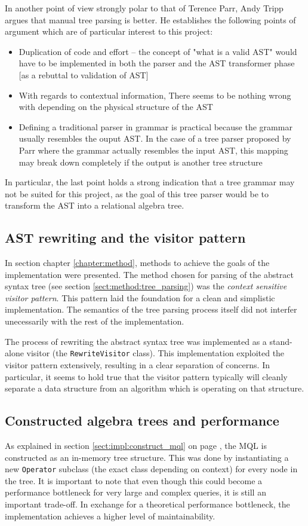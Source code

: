 In another point of view strongly polar to that of Terence Parr, Andy Tripp
argues\cite{manual_tree_walking_is_better} that manual tree parsing is
better. He establishes the following points of argument which are of particular
interest to this project:
\begin{itemize}
  \item Duplication of code and effort -- the concept of "what is a valid AST"
  would have to be implemented in both the parser and the AST transformer phase
  [as a rebuttal to validation of AST]
  \item With regards to contextual information, There seems to be nothing wrong
  with depending on the physical structure of the AST 
  \item Defining a traditional parser in grammar is practical because the grammar
  usually resembles the ouput AST. In the case of a tree parser proposed by Parr
  where the grammar actually resembles the input AST, this mapping may break
  down completely if the output is another tree structure
\end{itemize}

In particular, the last point holds a strong indication that a tree grammar
may not be suited for this project, as the goal of this tree parser would be to
transform the AST into a relational algebra tree.

\subsection{AST rewriting and the visitor pattern}
In section chapter \ref{chapter:method}, methods to achieve the goals
of the implementation were presented. The method chosen for parsing of the
abstract syntax tree (see section \ref{sect:method:tree_parsing}) was the
\emph{context sensitive visitor pattern}. This pattern laid the foundation for
a clean and simplistic implementation. The semantics of the tree parsing process
itself did not interfer unecessarily with the rest of the implementation.

The process of rewriting the abstract syntax tree was implemented as a
stand-alone visitor (the \texttt{RewriteVisitor} class). This implementation
exploited the visitor pattern extensively, resulting in a clear separation of
concerns. In particular, it seems to hold true that the visitor pattern
typically will cleanly separate a data structure from an algorithm which is
operating on that structure.

\subsection{Constructed algebra trees and performance}
As explained in section \ref{sect:impl:construct_mql} on page
\pageref{sect:impl:construct_mql}, the MQL is constructed as an in-memory tree
structure. This was done by instantiating a new \texttt{Operator} subclass
(the exact class depending on context) for every node in the tree. It is
important to note that even though this could become a performance bottleneck
for very large and complex queries, it is still an important trade-off. In
exchange for a theoretical performance bottleneck, the implementation achieves a
higher level of maintainability.